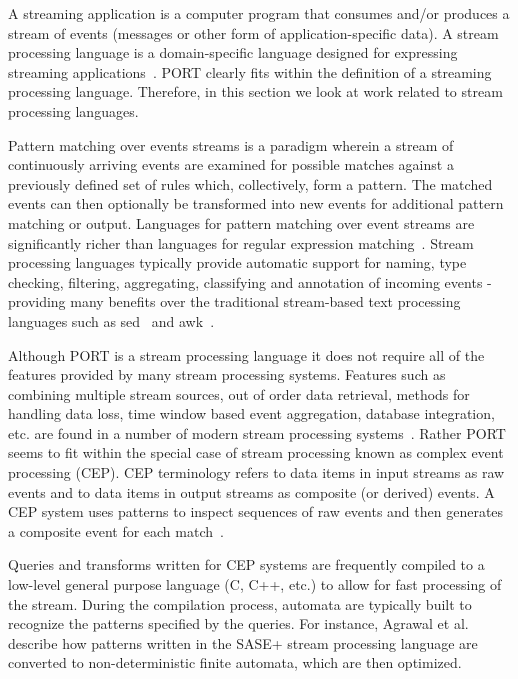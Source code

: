 A streaming application
is a computer program
that consumes and/or
produces
a stream of events (messages or other form of application-specific data).
A stream processing language is a domain-specific language
designed for expressing streaming applications~\cite{DBLP:journals/sigmod/HirzelBBVSV18}. PORT clearly
fits within the definition of a streaming processing language.
Therefore, in this
section we look at work related to stream processing languages.

Pattern matching
over events streams is a paradigm
wherein a stream of continuously arriving events are examined for
possible matches against a previously defined set of rules which, collectively, form a pattern.
The matched events can then optionally be transformed into new events for additional pattern matching or output.
Languages for pattern matching over event
streams are significantly richer than languages for regular expression
matching~\cite{DBLP:conf/sigmod/AgrawalDGI08}.
Stream processing languages typically provide automatic
support for naming, type checking, filtering, aggregating, classifying and
annotation of incoming events - providing many benefits over the traditional
stream-based text processing languages such as sed~\cite{Mcmahon1979sed} and
awk~\cite{DBLP:journals/spe/AhoKW79}.

Although PORT is a stream processing language it does not
require all of the features provided by many stream processing systems. Features
such as combining multiple stream sources, out of order data retrieval, methods
for handling data loss, time window based event aggregation, database
integration, etc. are found in a number of modern stream processing
systems~\cite{DBLP:journals/csur/DayarathnaP18}.   Rather PORT seems to fit within the special case of
stream processing known as complex event processing (CEP). CEP terminology refers
to data items in input streams as raw events and to data items in output streams
as composite (or derived) events. A CEP system uses patterns to inspect
sequences of raw events and then generates a composite event for each
match~\cite{DBLP:journals/ibmrd/HirzelAGJKKMNSSW13}.

Queries and transforms written for CEP systems are
frequently compiled to a low-level general purpose language (C, C++, etc.) to allow for fast
processing of the stream. During the compilation process, automata are typically
built to recognize the patterns specified by the queries. For instance, Agrawal et
al.~\cite{DBLP:conf/sigmod/AgrawalDGI08} describe how patterns written in the SASE+ stream
processing language are converted to non-deterministic finite automata, which are then
optimized.

